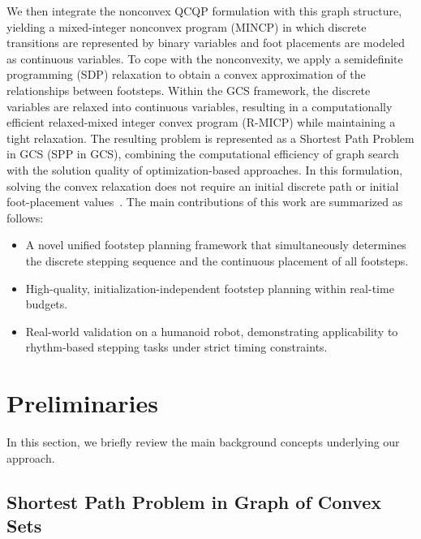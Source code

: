 \documentclass[letterpaper, 10 pt, journal, twoside]{IEEEtran}
\begin{document}
We then integrate the nonconvex QCQP formulation with this graph structure, yielding a mixed-integer nonconvex program (MINCP) in which discrete transitions are represented by binary variables and foot placements are modeled as continuous variables.
To cope with the nonconvexity, we apply a semidefinite programming (SDP) relaxation to obtain a convex approximation of the relationships between footsteps.
Within the GCS framework, the discrete variables are relaxed into continuous variables, resulting in a computationally efficient relaxed-mixed integer convex program (R-MICP) while maintaining a tight relaxation.
The resulting problem is represented as a Shortest Path Problem in GCS (SPP in GCS), combining the computational efficiency of graph search with the solution quality of optimization-based approaches.
In this formulation, solving the convex relaxation does not require an initial discrete path or initial foot-placement values~\cite{marcucci2024shortest,marcucci2023motion}.
The main contributions of this work are summarized as follows:
\begin{itemize}
    \setlength\itemsep{0.5em}
    \item A novel unified footstep planning framework that simultaneously determines the discrete stepping sequence and the continuous placement of all footsteps.
    \item High-quality, initialization-independent footstep planning within real-time budgets. 
    \item Real-world validation on a humanoid robot, demonstrating applicability to rhythm-based stepping tasks under strict timing constraints.
\end{itemize}

\section{Preliminaries}

In this section, we briefly review the main background concepts underlying our approach.

\subsection{Shortest Path Problem in Graph of Convex Sets}
\label{sec:spp_gcs}
\end{document}
